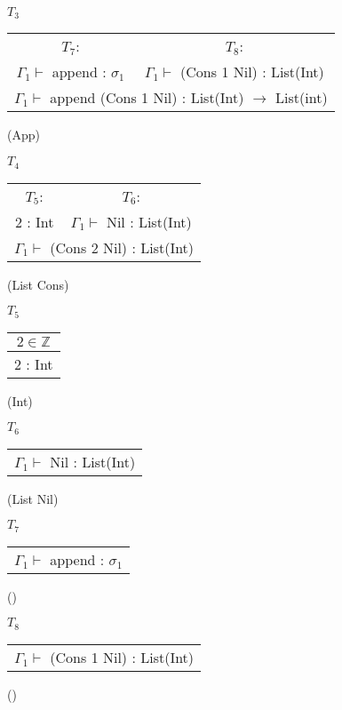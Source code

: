 \documentclass[12pt, a4paper]{article}
\begin{document}
\begin{enumerate}[(a)]
	$T_3$
	\begin{tabular}{c c}
		$T_7$: & $T_8$:\\
		$\Gamma_1 \vdash$ append : $\sigma_1$ & $\Gamma_1 \vdash$ (Cons 1 Nil) : List(Int)
		\\\hline
		\multicolumn{2}{c}{$\Gamma_1 \vdash$ append (Cons 1 Nil) : List(Int) $\rightarrow$ List(int)}
	\end{tabular}
	(App)

	$T_4$
	\begin{tabular}{c c}
		$T_5$: & $T_6$:\\
		2 : Int & $\Gamma_1 \vdash$ Nil : List(Int)
		\\\hline
		\multicolumn{2}{c}{$\Gamma_1 \vdash$ (Cons 2 Nil) : List(Int)}
	\end{tabular}
	(List Cons)

	$T_5$
	\begin{tabular}{c}
		$2 \in \mathbb{Z}$
		\\\hline
		2 : Int
	\end{tabular}
	(Int)

	$T_6$
	\begin{tabular}{c}
		\\\hline
		$\Gamma_1 \vdash$ Nil : List(Int)
	\end{tabular}
	(List Nil)

	$T_7$
	\begin{tabular}{c}
		\\\hline
		$\Gamma_1 \vdash$ append : $\sigma_1$
	\end{tabular}
	()

	$T_8$
	\begin{tabular}{c}
		\\\hline
		$\Gamma_1 \vdash$ (Cons 1 Nil) : List(Int)
	\end{tabular}
	()
\end{enumerate}

\section{} %
\end{document}

